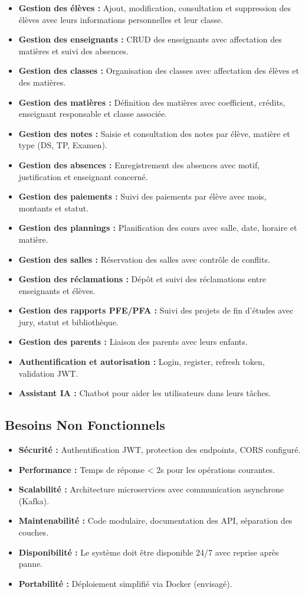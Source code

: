 \documentclass[12pt,a4paper,twoside]{report}
\begin{document}
\begin{itemize}[leftmargin=*]
  \item \textbf{Gestion des élèves :} Ajout, modification, consultation et suppression des élèves avec leurs informations personnelles et leur classe.
  \item \textbf{Gestion des enseignants :} CRUD des enseignants avec affectation des matières et suivi des absences.
  \item \textbf{Gestion des classes :} Organisation des classes avec affectation des élèves et des matières.
  \item \textbf{Gestion des matières :} Définition des matières avec coefficient, crédits, enseignant responsable et classe associée.
  \item \textbf{Gestion des notes :} Saisie et consultation des notes par élève, matière et type (DS, TP, Examen).
  \item \textbf{Gestion des absences :} Enregistrement des absences avec motif, justification et enseignant concerné.
  \item \textbf{Gestion des paiements :} Suivi des paiements par élève avec mois, montants et statut.
  \item \textbf{Gestion des plannings :} Planification des cours avec salle, date, horaire et matière.
  \item \textbf{Gestion des salles :} Réservation des salles avec contrôle de conflits.
  \item \textbf{Gestion des réclamations :} Dépôt et suivi des réclamations entre enseignants et élèves.
  \item \textbf{Gestion des rapports PFE/PFA :} Suivi des projets de fin d'études avec jury, statut et bibliothèque.
  \item \textbf{Gestion des parents :} Liaison des parents avec leurs enfants.
  \item \textbf{Authentification et autorisation :} Login, register, refresh token, validation JWT.
  \item \textbf{Assistant IA :} Chatbot pour aider les utilisateurs dans leurs tâches.
\end{itemize}

\subsection{Besoins Non Fonctionnels}
\begin{itemize}[leftmargin=*]
  \item \textbf{Sécurité :} Authentification JWT, protection des endpoints, CORS configuré.
  \item \textbf{Performance :} Temps de réponse < 2s pour les opérations courantes.
  \item \textbf{Scalabilité :} Architecture microservices avec communication asynchrone (Kafka).
  \item \textbf{Maintenabilité :} Code modulaire, documentation des API, séparation des couches.
  \item \textbf{Disponibilité :} Le système doit être disponible 24/7 avec reprise après panne.
  \item \textbf{Portabilité :} Déploiement simplifié via Docker (envisagé).
\end{itemize}
\end{document}
